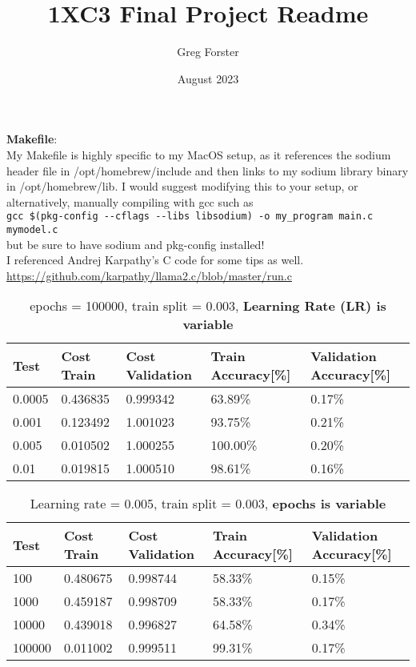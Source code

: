 \documentclass{report}
\title{1XC3 Final Project Readme}
\author{Greg Forster}
\date{August 2023}
\begin{document}
\maketitle

\textbf{Makefile}: \\

My Makefile is highly specific to my MacOS setup, as it references the sodium header file in /opt/homebrew/include and then links to my sodium library binary in /opt/homebrew/lib. I would suggest modifying this to your setup, or alternatively, manually compiling with gcc such as \\ \verb|gcc $(pkg-config --cflags --libs libsodium) -o my_program main.c mymodel.c| \\ but be sure to have sodium and pkg-config installed! \\

I referenced Andrej Karpathy's C code for some tips as well. 
\href{https://github.com/karpathy/llama2.c/blob/master/run.c}{https://github.com/karpathy/llama2.c/blob/master/run.c}



\begin{table}[h!]
\centering
\caption{epochs = 100000, train split = 0.003, \textbf{Learning Rate (LR) is variable}}
\vspace{10pt}  %
\small
\begin{tabularx}{\textwidth}{@{} X X X X X @{}}
\hline
{Test} & {Cost Train} & {Cost Validation} & {Train Accuracy[\%]} & {Validation Accuracy[\%]} \\
\hline
0.0005 & 0.436835 & 0.999342 & 63.89\% & 0.17\% \\
\hline
0.001 & 0.123492 & 1.001023 & 93.75\% & 0.21\% \\
\hline
0.005 & 0.010502 & 1.000255 & 100.00\% & 0.20\% \\
\hline
0.01 & 0.019815 & 1.000510 & 98.61\% & 0.16\% \\
\hline
\end{tabularx}
\normalsize
\end{table}

\begin{table}[h!]
\centering
\caption{Learning rate = 0.005, train split = 0.003, \textbf{epochs is variable}}
\vspace{10pt}  %
\begin{tabularx}{\textwidth}{@{} X X X X X @{}}
\hline
{Test} & {Cost Train} & {Cost Validation} & {Train Accuracy[\%]} & {Validation Accuracy[\%]} \\
\hline
100 & 0.480675 & 0.998744 & 58.33\% & 0.15\% \\
\hline
1000 & 0.459187 & 0.998709 & 58.33\% & 0.17\% \\
\hline
10000 & 0.439018 & 0.996827 & 64.58\% & 0.34\% \\
\hline
100000 & 0.011002 & 0.999511 & 99.31\% & 0.17\% \\
\hline
\end{tabularx}
\end{table}
\end{document}

